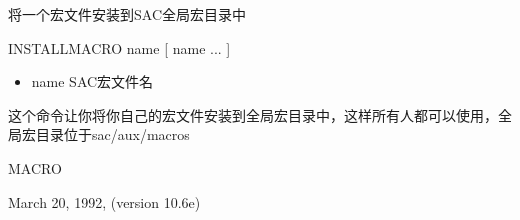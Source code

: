 \label{cmd:installmacro}

将一个宏文件安装到SAC全局宏目录中

INSTALLMACRO name [ name ... ]

\begin{itemize}
\item name SAC宏文件名
\end{itemize}

这个命令让你将你自己的宏文件安装到全局宏目录中，这样所有人都可以使用，全局宏目录位于sac/aux/macros

MACRO

March 20, 1992, (version 10.6e)
